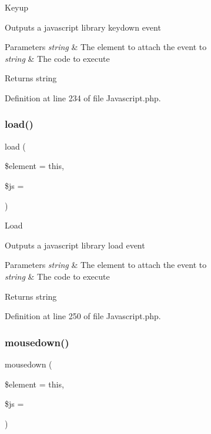 Keyup

Outputs a javascript library keydown event


\begin{DoxyParams}{Parameters}
{\em string} & The element to attach the event to \\
\hline
{\em string} & The code to execute \\
\hline
\end{DoxyParams}
\begin{DoxyReturn}{Returns}
string 
\end{DoxyReturn}


Definition at line 234 of file Javascript.\+php.

\mbox{\label{class_c_i___javascript_a5e0d3ce786a91561730aa9610b811f67}} 
\subsubsection{\texorpdfstring{load()}{load()}}
{\footnotesize\ttfamily load (\begin{DoxyParamCaption}\item[{}]{\$element = {\ttfamily \textquotesingle{}this\textquotesingle{}},  }\item[{}]{\$js = {\ttfamily \textquotesingle{}\textquotesingle{}} }\end{DoxyParamCaption})}

Load

Outputs a javascript library load event


\begin{DoxyParams}{Parameters}
{\em string} & The element to attach the event to \\
\hline
{\em string} & The code to execute \\
\hline
\end{DoxyParams}
\begin{DoxyReturn}{Returns}
string 
\end{DoxyReturn}


Definition at line 250 of file Javascript.\+php.

\mbox{\label{class_c_i___javascript_afa625106ad51c2f80ccfadf94981041d}} 
\subsubsection{\texorpdfstring{mousedown()}{mousedown()}}
{\footnotesize\ttfamily mousedown (\begin{DoxyParamCaption}\item[{}]{\$element = {\ttfamily \textquotesingle{}this\textquotesingle{}},  }\item[{}]{\$js = {\ttfamily \textquotesingle{}\textquotesingle{}} }\end{DoxyParamCaption})}

